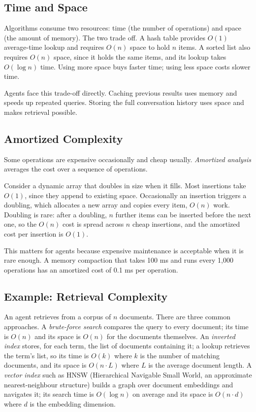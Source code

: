 \documentclass[11pt]{book}
\begin{document}
\subsection{Time and Space}

Algorithms consume two resources: time (the number of operations) and space (the amount of memory). The two trade off. A hash table provides $O(1)$ average-time lookup and requires $O(n)$ space to hold $n$ items. A sorted list also requires $O(n)$ space, since it holds the same items, and its lookup takes $O(\log n)$ time. Using more space buys faster time; using less space costs slower time.

Agents face this trade-off directly. Caching previous results uses memory and speeds up repeated queries. Storing the full conversation history uses space and makes retrieval possible.

\subsection{Amortized Complexity}

Some operations are expensive occasionally and cheap usually. \emph{Amortized analysis} averages the cost over a sequence of operations.

Consider a dynamic array that doubles in size when it fills. Most insertions take $O(1)$, since they append to existing space. Occasionally an insertion triggers a doubling, which allocates a new array and copies every item, $O(n)$ work. Doubling is rare: after a doubling, $n$ further items can be inserted before the next one, so the $O(n)$ cost is spread across $n$ cheap insertions, and the amortized cost per insertion is $O(1)$.

This matters for agents because expensive maintenance is acceptable when it is rare enough. A memory compaction that takes 100 ms and runs every 1{,}000 operations has an amortized cost of 0.1 ms per operation.

\subsection{Example: Retrieval Complexity}

An agent retrieves from a corpus of $n$ documents. There are three common approaches. A \textit{brute-force search} compares the query to every document; its time is $O(n)$ and its space is $O(n)$ for the documents themselves. An \textit{inverted index} stores, for each term, the list of documents containing it; a lookup retrieves the term's list, so its time is $O(k)$ where $k$ is the number of matching documents, and its space is $O(n \cdot L)$ where $L$ is the average document length. A \textit{vector index} such as HNSW (Hierarchical Navigable Small World, an approximate nearest-neighbour structure) builds a graph over document embeddings and navigates it; its search time is $O(\log n)$ on average and its space is $O(n \cdot d)$ where $d$ is the embedding dimension.
\end{document}

